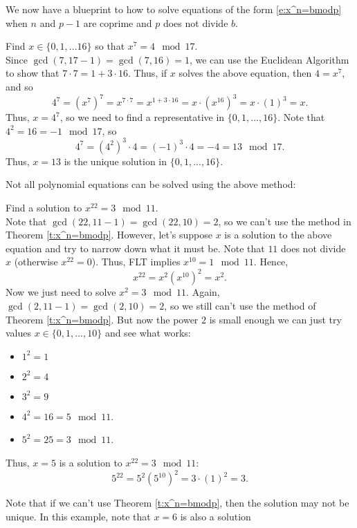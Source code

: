 \documentclass[11pt,dvipsnames]{book}
\numberwithin{figure}{section} %
\numberwithin{table}{section} %
\begin{document}
We now have a blueprint to how to solve equations of the form \eqref{e:x^n=bmodp} when $n$ and $p-1$ are coprime and $p$ does not divide $b$.

\begin{example}
 Find $x\in\{0,1,...16\}$ so that $ x^{7} = 4\mod 17$.  \\

Since $\gcd(7,17-1)=\gcd(7,16)=1$, we can use the Euclidean Algorithm to show that $7\cdot 7=1+3\cdot 16$.  Thus, if $x$ solves the above equation, then $4 = x^{7}$,   and so
\[
4^{7} = (x^{7})^{7}
= x^{7\cdot 7}
= x^{1+3\cdot 16}
 = x\cdot (x^{16})^{3}
   = x\cdot (1)^{3}
   = x.
\]
Thus, $x = 4^{7}$, so we need to find a representative in $\{0,1,...,16\}$. Note that $4^{2}=16 = -1\mod 17$,  so
\[
4^{7}=(4^{2})^{3} \cdot 4
 = (-1)^{3} \cdot 4
=-4 = 13\mod 17.
\]
Thus, $x=13$ is the unique solution in $\{0,1,...,16\}$.
\end{example}

Not all polynomial equations can be solved using the above method:

\begin{example}
Find a solution to $x^{22} = 3 \mod 11$.  \\

Note that $\gcd(22,11-1)=\gcd(22,10)=2$, so we can't use the method in Theorem \ref{t:x^n=bmodp}. However, let's suppose $x$ is a solution to the above equation and try to narrow down what it must be. Note that $11$ does not divide $x$   (otherwise $x^{22} = 0$).  Thus, FLT implies $x^{10} = 1 \mod 11$. Hence,
\[
x^{22}=x^{2}(x^{10})^{2}   = x^{2}.\]
Now we just need to solve $x^{2} = 3 \mod 11$.  Again, $\gcd(2,11-1)=\gcd(2,10)=2$, so we still can't use the method of Theorem \ref{t:x^n=bmodp}.  But now the power $2$ is small enough we can just try values $x\in \{0,1,...,10\}$ and see what works:

\begin{itemize}
\item $1^{2}=1$
\item $2^{2}=4$
\item $3^{2}=9$
\item $4^{2}=16 = 5 \mod 11$.
\item $5^{2}=25 = 3\mod 11$.
\end{itemize}
Thus, $x=5$ is a solution to $x^{22} = 3 \mod 11$:
\[
5^{22}=5^{2}(5^{10})^{2} = 3\cdot (1)^{2}=3.
\]

Note that if we can't use Theorem \ref{t:x^n=bmodp}, then the solution may not be unique. In this example, note that $x=6$ is also a solution
\end{example}
\end{document}
